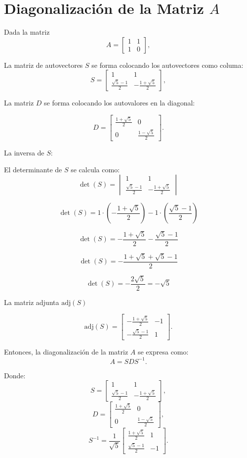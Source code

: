 \documentclass{article}
\begin{document}
\section*{Diagonalización de la Matriz $A$}

Dada la matriz
\[
A = \begin{bmatrix}
1 & 1 \\
1 & 0
\end{bmatrix},
\]

La matriz de autovectores \(S\) se forma colocando los autovectores como columa:
\[
S = \begin{bmatrix}
1 & 1 \\
\frac{\sqrt{5} - 1}{2} & -\frac{1 + \sqrt{5}}{2}
\end{bmatrix},
\]


La matriz \(D\) se forma colocando los autovalores en la diagonal:

\[
D = \begin{bmatrix}
\frac{1 + \sqrt{5}}{2} & 0 \\
0 & \frac{1 - \sqrt{5}}{2}
\end{bmatrix}.
\]

La inversa de \(S\):

El determinante de \( S \) se calcula como:
\[
\det(S) = \begin{vmatrix}
1 & 1 \\
\frac{\sqrt{5} - 1}{2} & -\frac{1 + \sqrt{5}}{2}
\end{vmatrix}
\]

\[
\det(S) = 1 \cdot \left(-\frac{1 + \sqrt{5}}{2}\right) - 1 \cdot \left(\frac{\sqrt{5} - 1}{2}\right)
\]

\[
\det(S) = -\frac{1 + \sqrt{5}}{2} - \frac{\sqrt{5} - 1}{2}
\]

\[
\det(S) = -\frac{1 + \sqrt{5} + \sqrt{5} - 1}{2}
\]

\[
\det(S) = -\frac{2\sqrt{5}}{2} = -\sqrt{5}
\]


La matriz adjunta \(\text{adj}(S)\) 

\[
\text{adj}(S) = \begin{bmatrix}
-\frac{1 + \sqrt{5}}{2} & -1 \\
-\frac{\sqrt{5} - 1}{2} & 1
\end{bmatrix}.
\]

Entonces, la diagonalización de la matriz \(A\) se expresa como:
\[
A = S D S^{-1}.
\]

Donde:
\[
S = \begin{bmatrix}
1 & 1 \\
\frac{\sqrt{5} - 1}{2} & -\frac{1 + \sqrt{5}}{2}
\end{bmatrix},
\]
\[
D = \begin{bmatrix}
\frac{1 + \sqrt{5}}{2} & 0 \\
0 & \frac{1 - \sqrt{5}}{2}
\end{bmatrix},
\]
\[
S^{-1} = \frac{1}{\sqrt{5}} \begin{bmatrix}
\frac{1 + \sqrt{5}}{2} & 1 \\
\frac{\sqrt{5} - 1}{2} & -1
\end{bmatrix}.
\]
\end{document}
